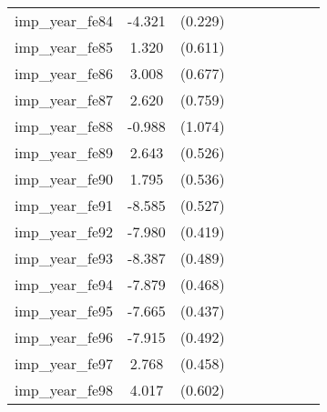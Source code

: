 {\begin{tabular}{l*{4}{cc}}
imp\_year\_fe84&   -4.321\sym{***}&  (0.229)&                  &         &                  &         &                  &         \\
imp\_year\_fe85&    1.320\sym{*}  &  (0.611)&                  &         &                  &         &                  &         \\
imp\_year\_fe86&    3.008\sym{***}&  (0.677)&                  &         &                  &         &                  &         \\
imp\_year\_fe87&    2.620\sym{***}&  (0.759)&                  &         &                  &         &                  &         \\
imp\_year\_fe88&   -0.988         &  (1.074)&                  &         &                  &         &                  &         \\
imp\_year\_fe89&    2.643\sym{***}&  (0.526)&                  &         &                  &         &                  &         \\
imp\_year\_fe90&    1.795\sym{***}&  (0.536)&                  &         &                  &         &                  &         \\
imp\_year\_fe91&   -8.585\sym{***}&  (0.527)&                  &         &                  &         &                  &         \\
imp\_year\_fe92&   -7.980\sym{***}&  (0.419)&                  &         &                  &         &                  &         \\
imp\_year\_fe93&   -8.387\sym{***}&  (0.489)&                  &         &                  &         &                  &         \\
imp\_year\_fe94&   -7.879\sym{***}&  (0.468)&                  &         &                  &         &                  &         \\
imp\_year\_fe95&   -7.665\sym{***}&  (0.437)&                  &         &                  &         &                  &         \\
imp\_year\_fe96&   -7.915\sym{***}&  (0.492)&                  &         &                  &         &                  &         \\
imp\_year\_fe97&    2.768\sym{***}&  (0.458)&                  &         &                  &         &                  &         \\
imp\_year\_fe98&    4.017\sym{***}&  (0.602)&                  &         &                  &         &                  &         \\

\end{tabular}}
